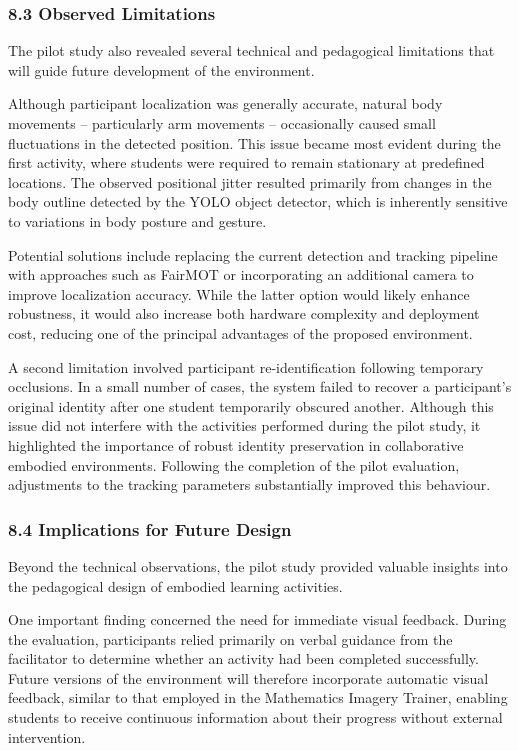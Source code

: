 \subsubsection{8.3 Observed Limitations}\label{observed-limitations}

The pilot study also revealed several technical and pedagogical
limitations that will guide future development of the environment.

Although participant localization was generally accurate, natural body
movements -- particularly arm movements -- occasionally caused small
fluctuations in the detected position. This issue became most evident
during the first activity, where students were required to remain
stationary at predefined locations. The observed positional jitter
resulted primarily from changes in the body outline detected by the YOLO
object detector, which is inherently sensitive to variations in body
posture and gesture.

Potential solutions include replacing the current detection and tracking
pipeline with approaches such as FairMOT or incorporating an additional
camera to improve localization accuracy. While the latter option would
likely enhance robustness, it would also increase both hardware
complexity and deployment cost, reducing one of the principal advantages
of the proposed environment.

A second limitation involved participant re-identification following
temporary occlusions. In a small number of cases, the system failed to
recover a participant's original identity after one student temporarily
obscured another. Although this issue did not interfere with the
activities performed during the pilot study, it highlighted the
importance of robust identity preservation in collaborative embodied
environments. Following the completion of the pilot evaluation,
adjustments to the tracking parameters substantially improved this
behaviour.

\subsubsection{8.4 Implications for Future
Design}\label{implications-for-future-design}

Beyond the technical observations, the pilot study provided valuable
insights into the pedagogical design of embodied learning activities.

One important finding concerned the need for immediate visual feedback.
During the evaluation, participants relied primarily on verbal guidance
from the facilitator to determine whether an activity had been completed
successfully. Future versions of the environment will therefore
incorporate automatic visual feedback, similar to that employed in the
Mathematics Imagery Trainer, enabling students to receive continuous
information about their progress without external intervention.

